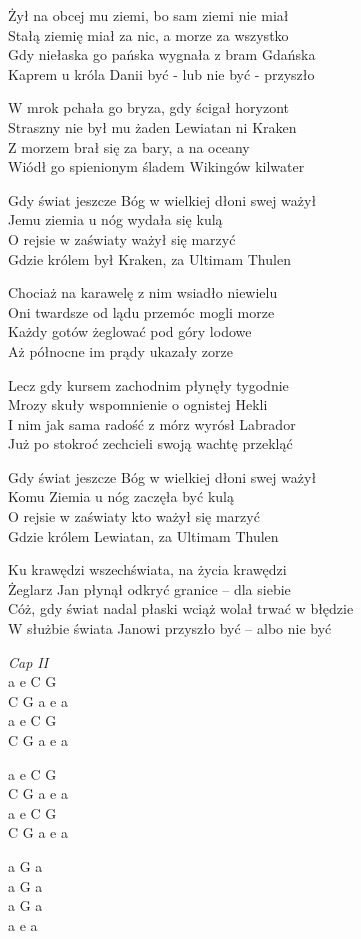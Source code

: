 \begin{text}

Żył na obcej mu ziemi, bo sam ziemi nie miał\\
Stałą ziemię miał za nic, a morze za wszystko\\
Gdy niełaska go pańska wygnała z bram Gdańska\\
Kaprem u króla Danii być - lub nie być - przyszło

W mrok pchała go bryza, gdy ścigał horyzont\\
Straszny nie był mu żaden Lewiatan ni Kraken\\
Z morzem brał się za bary, a na oceany\\
Wiódł go spienionym śladem Wikingów kilwater

Gdy świat jeszcze Bóg w wielkiej dłoni swej ważył\\
Jemu ziemia u nóg wydała się kulą\\
O rejsie w zaświaty ważył się marzyć\\
Gdzie królem był Kraken, za Ultimam Thulen

Chociaż na karawelę z nim wsiadło niewielu\\
Oni twardsze od lądu przemóc mogli morze\\
Każdy gotów żeglować pod góry lodowe\\
Aż północne im prądy ukazały zorze

Lecz gdy kursem zachodnim płynęły tygodnie\\
Mrozy skuły wspomnienie o ognistej Hekli\\
I nim jak sama radość z mórz wyrósł Labrador\\
Już po stokroć zechcieli swoją wachtę przekląć

Gdy świat jeszcze Bóg w wielkiej dłoni swej ważył\\
Komu Ziemia u nóg zaczęła być kulą\\
O rejsie w zaświaty kto ważył się marzyć\\
Gdzie królem Lewiatan, za Ultimam Thulen

Ku krawędzi wszechświata, na życia krawędzi\\
Żeglarz Jan płynął odkryć granice – dla siebie\\
Cóż, gdy świat nadal płaski wciąż wolał trwać w błędzie\\
W służbie świata Janowi przyszło być – albo nie być
 
\end{text}
\begin{chord}
    \small{
    \textit{Cap II}\\
    a e C G\\
    C G a e a\\
    a e C G\\
    C G a e a

    a e C G\\
    C G a e a\\
    a e C G\\
    C G a e a

    a G a\\
    a G a\\
    a G a\\
    a e a
    }
\end{chord}
